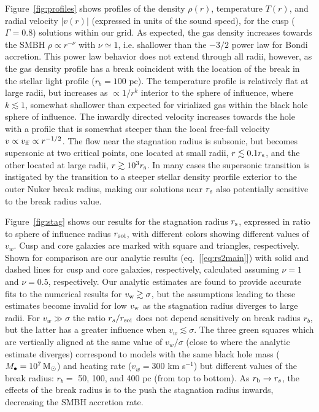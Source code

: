 \documentclass[usenatbib,fleqn]{mn2e}
\newcommand{\rs}{r_s}
\newcommand{\rb}{r_b}
\newcommand{\Mbh}[1][]{M_{\bullet#1}}
\newcommand{\soi}{\rm soi}
\newcommand{\rsoi}{r_{\soi}}
\newcommand{\densSlope}{\nu}
\begin{document}
Figure~\ref{fig:profiles} shows profiles of the density $\rho(r)$,
temperature $T(r)$, and radial velocity $|v(r)|$ (expressed in units of the sound speed), for the cusp
($\Gamma=0.8$) solutions within our grid.  As expected, the gas
density increases towards the SMBH $\rho\propto r^{-\densSlope}$ with
$\densSlope\simeq1$, i.e. shallower than the $-3/2$ power law for
Bondi accretion. This power law behavior does not extend
through all radii, however, as the gas density profile has a break coincident
with the location of the break in the stellar light profile ($\rb=100$
pc). The temperature profile is relatively flat at large radii, but
increases as $\propto 1/r^{k}$ interior to the sphere of influence,
where $k\lesssim 1$, somewhat shallower than expected for virialized gas within the black hole sphere of influence.
The inwardly directed velocity increases towards the hole with a profile that is somewhat steeper than the local free-fall velocity $v \propto v_{\rm ff}\propto r^{-1/2}$.  The flow near the stagnation radius is subsonic, but becomes supersonic at two critical points, one located at small radii, $r \lesssim 0.1r_{\rm s}$, and the other located at large radii, $r \gtrsim 10^{3}r_{\rm s}$.  In many cases the supersonic transition is instigated by the transition to a steeper stellar density prorfile exterior to the outer Nuker break radius, making our solutions near $r_{\rm s}$ also potentially sensitive to the break radius value.

Figure~\ref{fig:stag} shows our results for the stagnation radius
$r_{\rm s}$, expressed in ratio to sphere of influence radius $r_{\rm
  soi}$, with different colors showing different values of $v_{w}$.
Cusp and core galaxies are marked with square and triangles,
respectively.  Shown for comparison are our analytic results
(eq.~[\ref{eq:rs2main}]) with solid and dashed lines for cusp and core
galaxies, respectively, calculated assuming $\densSlope = 1$ and
$\densSlope= 0.5$, respectively.  Our analytic estimates are found to
provide accurate fits to the numerical results for $v_{\rm w} \gtrsim
\sigma$, but the assumptions leading to these estimates become invalid
for low $v_{\rm w}$ as the stagnation radius diverges to large radii.
For $v_{w} \gg \sigma$ the ratio $\rs/\rsoi$ does not depend
sensitively on break radius $r_{b}$, but the latter has a greater
influence when $v_{w} \lesssim \sigma$.  The three green squares which
are vertically aligned at the same value of $v_{w}/\sigma$ (close to
where the analytic estimate diverges) correspond to models with the
same black hole mass ($\Mbh = 10^7 \Msun$) and heating rate ($v_w =
300$ km s$^{-1}$) but different values of the break radius: $r_{b} = $
50, 100, and 400 pc (from top to bottom).  As $r_{\rm b} \rightarrow
r_{s}$, the effects of the break radius is to the push the stagnation
radius inwards, decreasing the SMBH accretion rate.
\end{document}
